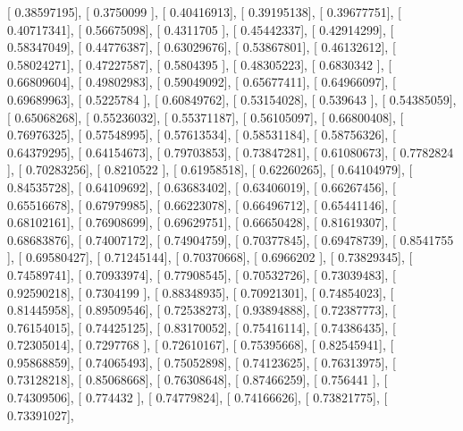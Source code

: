 \documentclass{article}
\begin{document}
       [ 0.38597195],
       [ 0.3750099 ],
       [ 0.40416913],
       [ 0.39195138],
       [ 0.39677751],
       [ 0.40717341],
       [ 0.56675098],
       [ 0.4311705 ],
       [ 0.45442337],
       [ 0.42914299],
       [ 0.58347049],
       [ 0.44776387],
       [ 0.63029676],
       [ 0.53867801],
       [ 0.46132612],
       [ 0.58024271],
       [ 0.47227587],
       [ 0.5804395 ],
       [ 0.48305223],
       [ 0.6830342 ],
       [ 0.66809604],
       [ 0.49802983],
       [ 0.59049092],
       [ 0.65677411],
       [ 0.64966097],
       [ 0.69689963],
       [ 0.5225784 ],
       [ 0.60849762],
       [ 0.53154028],
       [ 0.539643  ],
       [ 0.54385059],
       [ 0.65068268],
       [ 0.55236032],
       [ 0.55371187],
       [ 0.56105097],
       [ 0.66800408],
       [ 0.76976325],
       [ 0.57548995],
       [ 0.57613534],
       [ 0.58531184],
       [ 0.58756326],
       [ 0.64379295],
       [ 0.64154673],
       [ 0.79703853],
       [ 0.73847281],
       [ 0.61080673],
       [ 0.7782824 ],
       [ 0.70283256],
       [ 0.8210522 ],
       [ 0.61958518],
       [ 0.62260265],
       [ 0.64104979],
       [ 0.84535728],
       [ 0.64109692],
       [ 0.63683402],
       [ 0.63406019],
       [ 0.66267456],
       [ 0.65516678],
       [ 0.67979985],
       [ 0.66223078],
       [ 0.66496712],
       [ 0.65441146],
       [ 0.68102161],
       [ 0.76908699],
       [ 0.69629751],
       [ 0.66650428],
       [ 0.81619307],
       [ 0.68683876],
       [ 0.74007172],
       [ 0.74904759],
       [ 0.70377845],
       [ 0.69478739],
       [ 0.8541755 ],
       [ 0.69580427],
       [ 0.71245144],
       [ 0.70370668],
       [ 0.6966202 ],
       [ 0.73829345],
       [ 0.74589741],
       [ 0.70933974],
       [ 0.77908545],
       [ 0.70532726],
       [ 0.73039483],
       [ 0.92590218],
       [ 0.7304199 ],
       [ 0.88348935],
       [ 0.70921301],
       [ 0.74854023],
       [ 0.81445958],
       [ 0.89509546],
       [ 0.72538273],
       [ 0.93894888],
       [ 0.72387773],
       [ 0.76154015],
       [ 0.74425125],
       [ 0.83170052],
       [ 0.75416114],
       [ 0.74386435],
       [ 0.72305014],
       [ 0.7297768 ],
       [ 0.72610167],
       [ 0.75395668],
       [ 0.82545941],
       [ 0.95868859],
       [ 0.74065493],
       [ 0.75052898],
       [ 0.74123625],
       [ 0.76313975],
       [ 0.73128218],
       [ 0.85068668],
       [ 0.76308648],
       [ 0.87466259],
       [ 0.756441  ],
       [ 0.74309506],
       [ 0.774432  ],
       [ 0.74779824],
       [ 0.74166626],
       [ 0.73821775],
       [ 0.73391027],
\end{document}
